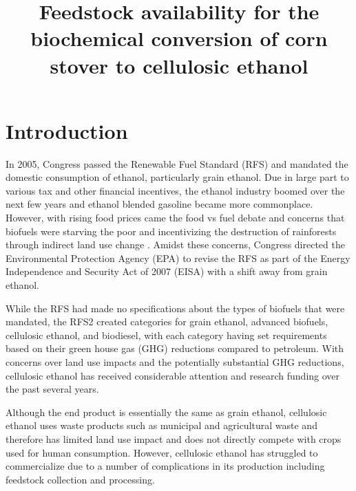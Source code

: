 \documentclass[12pt]{article}\usepackage[]{graphicx}\usepackage[]{color}
\begin{document}
 \thispagestyle{empty}
\lhead{\today}

\title{Feedstock availability for the biochemical conversion of corn stover to cellulosic ethanol}
\author{}
\date{}
\maketitle

\section{Introduction}
In 2005, Congress passed the Renewable Fuel Standard (RFS) and mandated the domestic consumption of ethanol, particularly grain ethanol.  Due in large part to various tax and other financial incentives, the ethanol industry boomed over the next few years and ethanol blended gasoline became more commonplace.  However, with rising food prices came the food vs fuel debate and concerns that biofuels were starving the poor \cite{Runge} and incentivizing the destruction of rainforests through indirect land use change \cite{Searchinger}.  Amidst these concerns, Congress directed the Environmental Protection Agency (EPA) to revise the RFS as part of the Energy Independence and Security Act of 2007 (EISA) with a shift away from grain ethanol.

While the RFS had made no specifications about the types of biofuels that were mandated, the RFS2 created categories for grain ethanol, advanced biofuels, cellulosic ethanol, and biodiesel, with each category having set requirements based on their green house gas (GHG) reductions compared to petroleum.  With concerns over land use impacts and the potentially substantial GHG reductions, cellulosic ethanol has received considerable attention and research funding over the past several years.

Although the end product is essentially the same as grain ethanol, cellulosic ethanol uses waste products such as municipal and agricultural waste and therefore has limited land use impact and does not directly compete with crops used for human consumption.  However, cellulosic ethanol has struggled to commercialize due to a number of complications in its production including feedstock collection and processing.  
\end{document}
